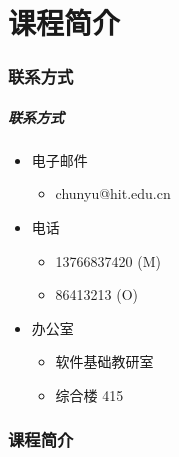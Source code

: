 
\part{课程简介}

\section{联系方式}
\begin{frame}
\frametitle{联系方式}
\begin{itemize}
\setlength{\itemsep}{8pt plus 1pt}
\item 电子邮件
  \begin{itemize}
  \item chunyu@hit.edu.cn
  \end{itemize}
\item 电话
  \begin{itemize}
  \item 13766837420 (M)
  \item 86413213 (O)
  \end{itemize}
\item 办公室
  \begin{itemize}
  \item 软件基础教研室
  \item 综合楼 415
  \end{itemize}
\end{itemize}
\end{frame}

\section{课程简介}

